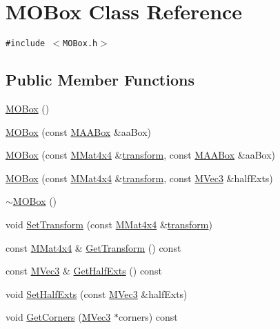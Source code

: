 \hypertarget{class_m_o_box}{
\section{MOBox Class Reference}
\label{class_m_o_box}
}
{\tt \#include $<$MOBox.h$>$}

\subsection*{Public Member Functions}
\begin{CompactItemize}
\item 
\hyperlink{class_m_o_box_7bf83cd9171ed3f579582c063f9c5cc9}{MOBox} ()
\item 
\hyperlink{class_m_o_box_d49b5de844f48790b8fe784d0f07d388}{MOBox} (const \hyperlink{class_m_a_a_box}{MAABox} \&aaBox)
\item 
\hyperlink{class_m_o_box_7f53529680eb35e91d981ab83d0f4bb8}{MOBox} (const \hyperlink{class_m_mat4x4}{MMat4x4} \&\hyperlink{glext__bak_8h_07993c0d92c1aeeb357ba0495c8b5325}{transform}, const \hyperlink{class_m_a_a_box}{MAABox} \&aaBox)
\item 
\hyperlink{class_m_o_box_9c3fbd1a7b8484cc2ebaefdee6ed1238}{MOBox} (const \hyperlink{class_m_mat4x4}{MMat4x4} \&\hyperlink{glext__bak_8h_07993c0d92c1aeeb357ba0495c8b5325}{transform}, const \hyperlink{class_m_vec3}{MVec3} \&halfExts)
\item 
\hyperlink{class_m_o_box_5d831d82a6f18ceb4ded4f0aead4d37e}{$\sim$MOBox} ()
\item 
void \hyperlink{class_m_o_box_95a1b5fadc347c528687342a48b66bb4}{SetTransform} (const \hyperlink{class_m_mat4x4}{MMat4x4} \&\hyperlink{glext__bak_8h_07993c0d92c1aeeb357ba0495c8b5325}{transform})
\item 
const \hyperlink{class_m_mat4x4}{MMat4x4} \& \hyperlink{class_m_o_box_1460a55261c4b5dbd9238e8c5c7371f4}{GetTransform} () const 
\item 
const \hyperlink{class_m_vec3}{MVec3} \& \hyperlink{class_m_o_box_1f3cab4b1e09c90769183721f3e3d06b}{GetHalfExts} () const 
\item 
void \hyperlink{class_m_o_box_d0f5c304ee93de82dedace046647df4d}{SetHalfExts} (const \hyperlink{class_m_vec3}{MVec3} \&halfExts)
\item 
void \hyperlink{class_m_o_box_d4ab62fb0cb55df4774b656c8c99e51f}{GetCorners} (\hyperlink{class_m_vec3}{MVec3} $\ast$corners) const 
\end{CompactItemize}


